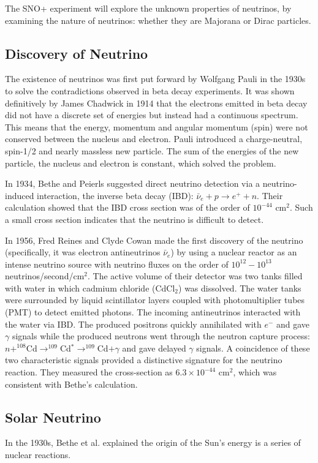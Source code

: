 \documentclass[preprint,12pt]{elsarticle}
\numberwithin{equation}{section}
\begin{document}
The SNO+ experiment will explore the unknown properties of neutrinos, by examining the nature of neutrinos: whether they are Majorana or Dirac particles.

\subsection{Discovery of Neutrino}
The existence of neutrinos was first put forward by Wolfgang Pauli in the 1930s to solve the contradictions observed in beta decay experiments. It was shown definitively by James Chadwick in 1914 that the electrons emitted in beta decay did not have a discrete set of energies but instead had a continuous spectrum\cite{cowanexpintro}. This means that the energy, momentum and angular momentum (spin) were not conserved between the nucleus and electron. Pauli introduced a charge-neutral, spin-1/2 and nearly massless new particle. The sum of the energies of the new particle, the nucleus and electron is constant, which solved the problem. 

In 1934, Bethe and Peierls suggested direct neutrino detection via a neutrino-induced interaction, the inverse beta decay (IBD): $\bar{\nu}_e+p\to e^+ + n$. Their calculation showed that the IBD cross section was of the order of $10^{-44}$ cm$^2$. Such a small cross section indicates that the neutrino is difficult to detect\cite{bethe1}.
 
In 1956, Fred Reines and Clyde Cowan made the first discovery of the neutrino (specifically, it was electron antineutrinos $\bar{\nu}_e$) by using a nuclear reactor as an intense neutrino source with neutrino fluxes on the order of $10^{12}-10^{13}$ neutrinos/second/cm$^2$. The active volume of their detector was two tanks filled with water in which cadmium chloride (CdCl$_2$) was dissolved. The water tanks were surrounded by liquid scintillator layers coupled with photomultiplier tubes (PMT) to detect emitted photons. The incoming antineutrinos interacted with the water via IBD. The produced positrons quickly annihilated with $e^-$ and gave $\gamma$ signals while the produced neutrons went through the neutron capture process: $n+^{108}$Cd$\to^{109}$Cd$^*\to^{109}$Cd$+\gamma$ and gave delayed $\gamma$ signals. A coincidence of these two characteristic signals provided a distinctive signature for the neutrino reaction. They measured the cross-section as $6.3\times10^{-44}$ cm$^2$, which was consistent with Bethe's calculation\cite{cowanexpintro,hyperphysicsCowan}.

\subsection{Solar Neutrino}
In the 1930s, Bethe et al. explained the origin of the Sun's energy is a series of nuclear reactions\cite{bethe2}.
\end{document}
